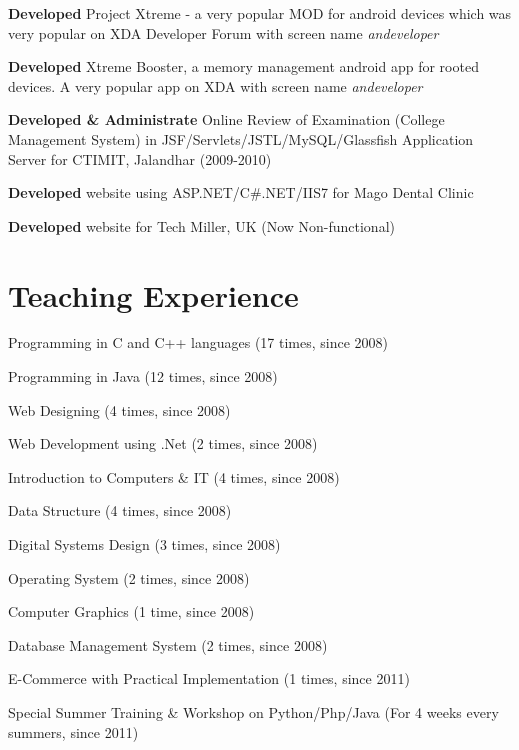 \documentclass[margin,line]{res}
\begin{document}
\begin{resume}
\textbf{Developed} Project Xtreme - a very popular MOD for android devices which was very popular on XDA Developer Forum with screen name \textit{andeveloper}

\textbf{Developed} Xtreme Booster, a memory management android app for rooted devices. A very popular app on XDA with screen name \textit{andeveloper}

\textbf{Developed \& Administrate} Online Review of Examination (College Management System) in JSF/Servlets/JSTL/MySQL/Glassfish Application Server for CTIMIT, Jalandhar (2009-2010)

\textbf{Developed} website using ASP.NET/C\#.NET/IIS7 for Mago Dental Clinic

\textbf{Developed} website for Tech Miller, UK (Now Non-functional)

\section{\sc Teaching Experience}

Programming in C and C++ languages (17 times, since 2008)

Programming in Java (12 times, since 2008)

Web Designing (4 times, since 2008)

Web Development using .Net (2 times, since 2008)

Introduction to Computers \& IT (4 times, since 2008)

Data Structure (4 times, since 2008)

Digital Systems Design (3 times, since 2008)

Operating System (2 times, since 2008)

Computer Graphics (1 time, since 2008)

Database Management System (2 times, since 2008)

E-Commerce with Practical Implementation (1 times, since 2011)

Special Summer Training \& Workshop on Python/Php/Java (For 4 weeks every summers, since 2011)


\end{resume}
\end{document}
